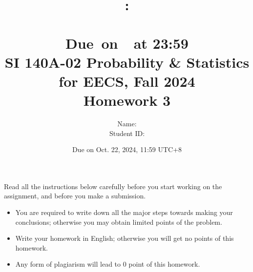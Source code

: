 \documentclass[a4paper]{article}
\title{
    \vspace{2in}
    \textmd{\textbf{\hmwkClass:\\  \hmwkTitle}}\\
    \normalsize\vspace{0.1in}\small{Due\ on\ \hmwkDueDate\ at 23:59}\\
	\vspace{4in}
}
\author{
	Name: \textbf{\hmwkAuthorName} \\
	Student ID: \hmwkAuthorID}
\date{}
\begin{document}

\date{
Due on Oct. 22, 2024, 11:59 UTC+8}
\title{SI 140A-02  Probability \& Statistics for EECS, Fall 2024 \\
Homework 3}
\maketitle
Read all the instructions below carefully before you start working on the assignment, and before you make a submission.
\begin{itemize}
    \item You are required to write down all the major steps towards making your conclusions; otherwise you may obtain limited points of the problem.
    \item Write your homework in English; otherwise you will get no points of this homework.
    \item Any form of plagiarism will lead to $0$ point of this homework. 
\end{itemize}
\newpage
\end{document}
